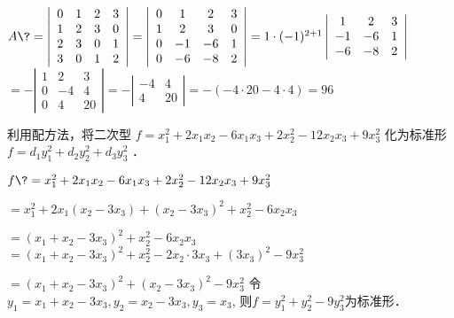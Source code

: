 \documentclass{jnuexam}
\begin{document}
\smallskip

\begin{solution}
$A \? = \left|\begin{array}{cccc}
    0 & 1 & 2 & 3\\
    1 & 2 & 3 & 0\\
    2 & 3 & 0 & 1\\
    3 & 0 & 1 & 2
  \end{array}\right| = \left|\begin{array}{cccc}
    0 & 1 & 2 & 3\\
    1 & 2 & 3 & 0\\
    0 & - 1 & - 6 & 1\\
    0 & - 6 & - 8 & 2
  \end{array}\right| = 1 \cdot (- 1)^{2 + 1} \left|\begin{array}{ccc}
    1 & 2 & 3\\
    - 1 & - 6 & 1\\
    - 6 & - 8 & 2
  \end{array}\right|$ 
\+ $= -\left|\begin{array}{ccc}
    1 & 2 & 3\\
    0 & - 4 & 4\\
    0 & 4 & 20
  \end{array}\right| = - \left|\begin{array}{cc}
    - 4 & 4\\
    4 & 20
  \end{array}\right| = -(-4\cdot20-4\cdot4) = 96$ 
\end{solution}

\vfill

\begin{problem}
利用配方法，将二次型 $f = x_1^2 + 2 x_1 x_2 - 6 x_1 x_3 + 2 x_2^2 - 12
x_2 x_3 + 9 x^2_3$ 化为标准形 $f = d_1 y^2_1 + d_2 y^2_2 + d_3 y^2_3$ ．
\end{problem}

\smallskip

\begin{solution}
$f \? = x_1^2 + 2 x_1 x_2 - 6 x_1 x_3 + 2 x_2^2 - 12 x_2 x_3 + 9 x^2_3$ \par
  \+ $= x_1^2 + 2 x_1 (x_2 - 3 x_3) + (x_2 - 3 x_3)^2 + x_2^2 - 6 x_2 x_3 $ \par
  \+ $= (x_1 + x_2 - 3 x_3)^2 + x_2^2 - 6 x_2 x_3$ 
  \+ $= (x_1 + x_2 - 3 x_3)^2 + x_2^2 - 2 x_2 \cdot 3 x_3 + (3 x_3)^2 - 9x_3^2$ \par
  \+ $= (x_1 + x_2 - 3 x_3)^2 + (x_2 - 3 x_3)^2 - 9 x_3^2$ 
令$y_1 = x_1 + x_2 - 3 x_3, y_2 = x_2 - 3 x_3, y_3 = x_3$, \newline
则$f = y_1^2 + y_2^2 - 9y_3^2$为标准形．
\end{solution}
\end{document}
